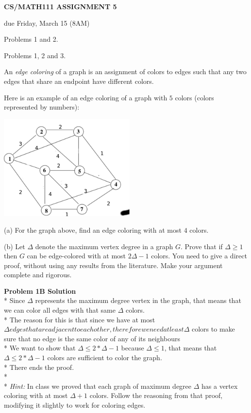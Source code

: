 \documentclass{article}
\begin{document}
\centerline{\large \bf CS/MATH111 ASSIGNMENT 5}
\centerline{due Friday, March 15 (8AM)}

\vskip 0.15in
 Problems 1 and 2.

 Problems 1, 2 and 3.

\vskip 0.15in


\begin{problem}
An \emph{edge coloring} of a graph is an
assignment of colors to edges such that any two
edges that share an endpoint have different colors.

Here is an example of an edge coloring of
a graph with $5$ colors (colors represented by numbers):

\begin{center}
\includegraphics[width=2.7in]{edge_color_hw5.pdf}
\end{center}

\noindent
(a) For the graph above, find an edge
coloring with at most $4$ colors.

\medskip
\noindent
(b)
Let $\Delta$ denote the maximum vertex degree in a graph $G$.
Prove that if $\Delta\ge 1$ then $G$ can be edge-colored with
at most $2\Delta-1$ colors.
You need to give a direct proof, without using
any results from the literature.
Make your argument complete and rigorous.

\textbf{Problem 1B Solution}
\\*
Since $\Delta$ represents the maximum degree vertex in the graph, that means that we can color all edges with that same $\Delta$ colors.
\\*
The reason for this is that since we have at most $\Delta edges that are adjacent to eachother, therefore we need at least \Delta$ colors to make sure that no edge is the same color of any of its neighbours 
\\*
We want to show that $\Delta \leq 2*\Delta - 1$ because $\Delta \leq 1$, that means that $\Delta \leq 2*\Delta -1$ colors are sufficient to color the graph. 
\\*
There ends the proof.
\\*\\*
\smallskip
\emph{Hint:} In class we proved that each graph
of maximum degree $\Delta$ has a vertex coloring with at most
$\Delta+1$ colors. Follow the reasoning from that proof, modifying it slightly
to work for coloring edges.
\end{problem}
\end{document}
